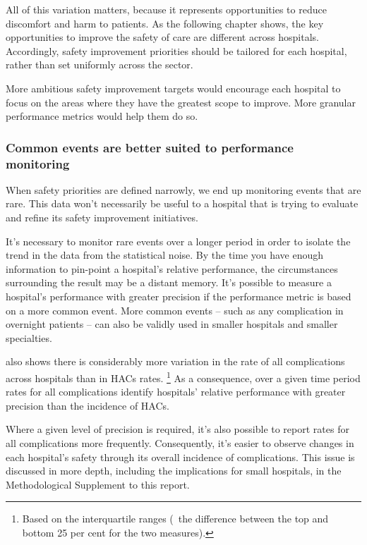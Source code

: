 \documentclass[FrontPage]{grattan}
\begin{document}
All of this variation matters, because it represents opportunities to reduce discomfort and harm to patients.
As the following chapter shows, the key opportunities to improve the safety of care are different across hospitals.
Accordingly, safety improvement priorities should be tailored for each hospital, rather than set uniformly across the sector.

More ambitious safety improvement targets would encourage each hospital to focus on the areas where they have the greatest scope to improve.
More granular performance metrics would help them do so.

\subsubsection{Common events are better suited to performance monitoring}\label{subsubsec:common-events-are-better-suited-to-performance-monitoring}

When safety priorities are defined narrowly, we end up monitoring events that are rare.
This data won't necessarily be useful to a hospital that is trying to evaluate and refine its safety improvement initiatives.

It's necessary to monitor rare events over a longer period in order to isolate the trend in the data from the statistical noise.
By the time you have enough information to pin-point a hospital's relative performance, the circumstances surrounding the result may be a distant memory.
It's possible to measure a hospital's performance with greater precision if the performance metric is based on a more common event.
More common events -- such as any complication in overnight patients -- can also be validly used in smaller hospitals and smaller specialties.

 also shows there is considerably more variation in the rate of all complications across hospitals than in HACs rates.%
	\footnote{Based on the interquartile ranges (\ie~the difference between the top and bottom 25 per cent for the two measures).}
As a consequence, over a given time period rates for all complications identify hospitals' relative performance with greater precision than the incidence of HACs.
	
Where a given level of precision is required, it's also possible to report rates for all complications more frequently.
Consequently, it's easier to observe changes in each hospital's safety through its overall incidence of complications.
This issue is discussed in more depth, including the implications for small hospitals, in the Methodological Supplement to this report.
\end{document}
